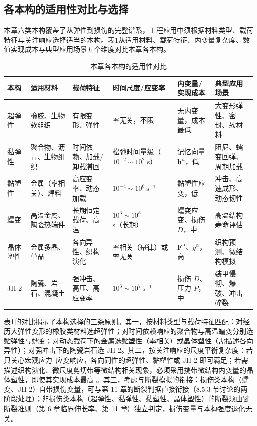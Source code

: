 \subsection{各本构的适用性对比与选择}\label{sec:fd-comparison}

本章六类本构覆盖了从弹性到损伤的完整谱系，工程应用中须根据材料类型、载荷特征与关注响应选择适当的本构。表\ref{tab:fd-comparison}从适用材料、载荷特征、内变量复杂度、数值实现成本与典型应用场景五个维度对比本章各本构。

\begin{table}[htbp]
  \centering
  \small
  \caption{本章各本构的适用性对比}
  \label{tab:fd-comparison}
  \begin{tabular}{>{\raggedright\arraybackslash}p{}>{\raggedright\arraybackslash}p{}>{\raggedright\arraybackslash}p{}>{\raggedright\arraybackslash}p{}>{\raggedright\arraybackslash}p{}>{\raggedright\arraybackslash}p{}}
    \toprule
    本构 & 适用材料 & 载荷特征 & 时间尺度/应变率 & 内变量/实现成本 & 典型应用场景 \\
    \midrule
    超弹性 & 橡胶、生物软组织 & 有限变形、弹性 & 率无关，不限 & 无内变量，成本最低 & 大变形弹性、密封、软材料 \\
    黏弹性 & 聚合物、沥青、生物组织 & 时间依赖、加载/卸载滞回 & 松弛时间量级（$10^{-2}\sim10^{2}$ s） & 记忆向量 $\mathbf{h}^{n}$，低 & 阻尼、蠕变回弹、周期加载 \\
    黏塑性 & 金属（率相关）、焊料 & 高应变率、动态加载 & $10^{-4}\sim10^{6}~\mathrm{s}^{-1}$ & 黏塑性应变，低 & 冲击、高速成形、动态韧性 \\
    蠕变 & 高温金属、陶瓷热端件 & 长期恒定载荷、高温 & $10^{3}\sim10^{8}$ s（长期） & 蠕变应变、损伤 $D$，中 & 高温结构寿命评估 \\
    晶体塑性 & 金属多晶、单晶 & 各向异性、织构演化 & 率相关（幂律）或率无关 & $\mathbf{F}^{\mathrm{p}}$、$g^{\alpha}$，高 & 织构预测、微结构模拟 \\
    JH-2 & 陶瓷、岩石、混凝土 & 强冲击、高压、高应变率 & $10^{3}\sim10^{7}~\mathrm{s}^{-1}$ & 损伤 $D$、压力 $P$，中 & 装甲侵彻、爆破、冲击碎裂 \\
    \bottomrule
  \end{tabular}
\end{table}

表\ref{tab:fd-comparison}的对比揭示了本构选择的三条原则。其一，按材料类型与载荷特征匹配：对经历大弹性变形的橡胶类材料选超弹性；对时间依赖响应的聚合物与高温蠕变分别选黏弹性与蠕变；对动态载荷下的金属选黏塑性（率相关）或晶体塑性（需描述各向异性）；对强冲击下的陶瓷岩石选 JH-2。其二，按关注响应的尺度平衡复杂度：若只关心宏观应力--应变响应，各向同性的超弹性、黏塑性或 JH-2 即可满足；若需描述织构演化、微尺度剪切带等微结构相关现象，必须采用携带微结构内变量的晶体塑性，即使其实现成本最高 \cite{Roters2010}。其三，考虑与断裂模拟的衔接：损伤类本构（蠕变、JH-2）自带损伤变量，可与第 11 章的断裂判据直接衔接（8.5.3 节讨论的两阶段处理）；非损伤类本构（超弹性、黏弹性、黏塑性、晶体塑性）的断裂须由键断裂准则（第 6 章临界伸长率、第 11 章）独立判定，损伤变量与本构强度退化无关。

